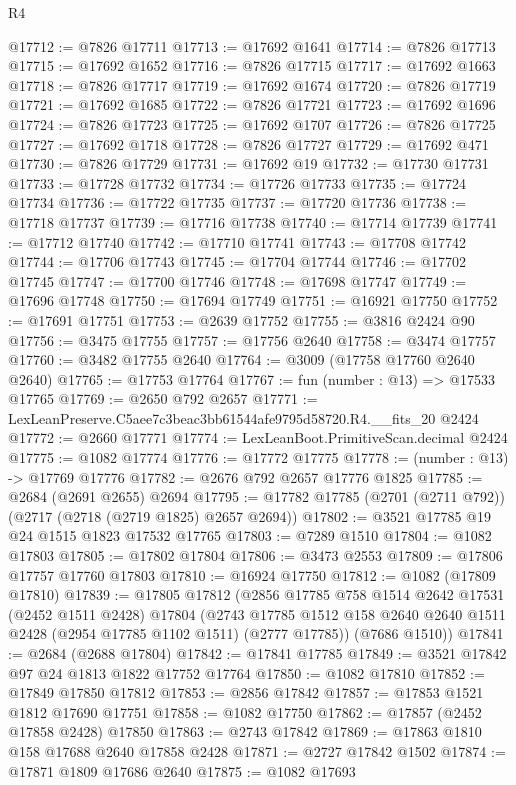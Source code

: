 \begin{lexlean}{R4}
\begin{coremodule}
@17712 := @7826 @17711
@17713 := @17692 @1641
@17714 := @7826 @17713
@17715 := @17692 @1652
@17716 := @7826 @17715
@17717 := @17692 @1663
@17718 := @7826 @17717
@17719 := @17692 @1674
@17720 := @7826 @17719
@17721 := @17692 @1685
@17722 := @7826 @17721
@17723 := @17692 @1696
@17724 := @7826 @17723
@17725 := @17692 @1707
@17726 := @7826 @17725
@17727 := @17692 @1718
@17728 := @7826 @17727
@17729 := @17692 @471
@17730 := @7826 @17729
@17731 := @17692 @19
@17732 := @17730 @17731
@17733 := @17728 @17732
@17734 := @17726 @17733
@17735 := @17724 @17734
@17736 := @17722 @17735
@17737 := @17720 @17736
@17738 := @17718 @17737
@17739 := @17716 @17738
@17740 := @17714 @17739
@17741 := @17712 @17740
@17742 := @17710 @17741
@17743 := @17708 @17742
@17744 := @17706 @17743
@17745 := @17704 @17744
@17746 := @17702 @17745
@17747 := @17700 @17746
@17748 := @17698 @17747
@17749 := @17696 @17748
@17750 := @17694 @17749
@17751 := @16921 @17750
@17752 := @17691 @17751
@17753 := @2639 @17752
@17755 := @3816 @2424 @90
@17756 := @3475 @17755
@17757 := @17756 @2640
@17758 := @3474 @17757
@17760 := @3482 @17755 @2640
@17764 := @3009 (@17758 @17760 @2640 @2640)
@17765 := @17753 @17764
@17767 := fun (number : @13) => @17533 @17765
@17769 := @2650 @792 @2657
@17771 := LexLeanPreserve.C5aee7c3beac3bb61544afe9795d58720.R4.__fits_20 @2424
@17772 := @2660 @17771
@17774 := LexLeanBoot.PrimitiveScan.decimal @2424
@17775 := @1082 @17774
@17776 := @17772 @17775
@17778 := (number : @13) -> @17769 @17776
@17782 := @2676 @792 @2657 @17776 @1825
@17785 := @2684 (@2691 @2655) @2694
@17795 := @17782 @17785 (@2701 (@2711 @792)) (@2717 (@2718 (@2719 @1825) @2657 @2694))
@17802 := @3521 @17785 @19 @24 @1515 @1823 @17532 @17765
@17803 := @7289 @1510
@17804 := @1082 @17803
@17805 := @17802 @17804
@17806 := @3473 @2553
@17809 := @17806 @17757 @17760 @17803
@17810 := @16924 @17750
@17812 := @1082 (@17809 @17810)
@17839 := @17805
    @17812
    (@2856
      @17785
      @758
      @1514
      @2642
      @17531
      (@2452 @1511 @2428)
      @17804
      (@2743 @17785 @1512 @158 @2640 @2640 @1511 @2428 (@2954 @17785 @1102 @1511) (@2777 @17785))
      (@7686 @1510))
@17841 := @2684 (@2688 @17804)
@17842 := @17841 @17785
@17849 := @3521 @17842 @97 @24 @1813 @1822 @17752 @17764
@17850 := @1082 @17810
@17852 := @17849 @17850 @17812
@17853 := @2856 @17842
@17857 := @17853 @1521 @1812 @17690 @17751
@17858 := @1082 @17750
@17862 := @17857 (@2452 @17858 @2428) @17850
@17863 := @2743 @17842
@17869 := @17863 @1810 @158 @17688 @2640 @17858 @2428
@17871 := @2727 @17842 @1502
@17874 := @17871 @1809 @17686 @2640
@17875 := @1082 @17693

\end{coremodule}
\end{lexlean}
